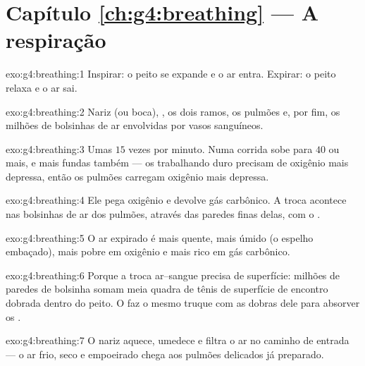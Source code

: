 \section*{Capítulo \ref{ch:g4:breathing} --- A respiração}

\begin{solution}{exo:g4:breathing:1}
Inspirar: o peito se expande e o ar entra. Expirar: o peito relaxa e
o ar sai.
\end{solution}

\begin{solution}{exo:g4:breathing:2}
Nariz (ou boca), , os dois ramos, os pulmões e, por fim, os
milhões de bolsinhas de ar envolvidas por vasos sanguíneos.
\end{solution}

\begin{solution}{exo:g4:breathing:3}
Umas $15$ vezes por minuto. Numa corrida sobe para $40$ ou mais, e
mais fundas também --- os  trabalhando duro precisam de
oxigênio mais depressa, então os pulmões carregam oxigênio mais
depressa.
\end{solution}

\begin{solution}{exo:g4:breathing:4}
Ele pega oxigênio e devolve gás carbônico. A troca acontece nas
bolsinhas de ar dos pulmões, através das paredes finas delas, com o
.
\end{solution}

\begin{solution}{exo:g4:breathing:5}
O ar expirado é mais quente, mais úmido (o espelho embaçado), mais
pobre em oxigênio e mais rico em gás carbônico.
\end{solution}

\begin{solution}{exo:g4:breathing:6}
Porque a troca ar--sangue precisa de superfície: milhões de paredes
de bolsinha somam meia quadra de tênis de superfície de encontro
dobrada dentro do peito. O  faz o mesmo truque com
as dobras dele para absorver os .
\end{solution}

\begin{solution}{exo:g4:breathing:7}
O nariz aquece, umedece e filtra o ar no caminho de entrada --- o ar
frio, seco e empoeirado chega aos pulmões delicados já preparado.
\end{solution}

